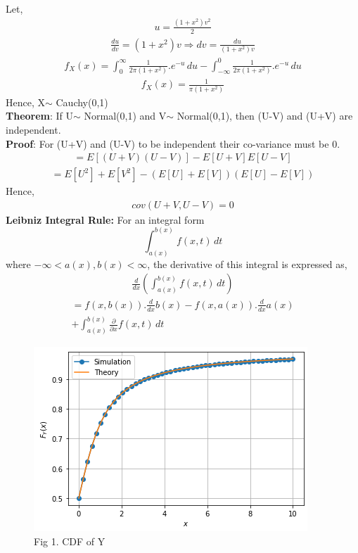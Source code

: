 \documentclass[journal,12pt,twocolumn]{IEEEtran}
\begin{document}
Let,
\begin{align}
 u = \frac{(1+x^2)v^2}{2}
\end{align}
\begin{align}
 \frac{du}{dv} = (1+x^2)v \Rightarrow dv = \frac{du}{(1+x^2)v}
\end{align}
\begin{align}
    f_{X}(x) = \int_{0}^{\infty}  \frac{1}{2\pi (1+x^2)}.e^{-u} \,du - \int_{-\infty}^{0}\frac{1}{2\pi(1+x^2)}.e^{-u}\,du
\end{align}
\begin{align}
    f_{X}(x) = \frac{1}{\pi(1+x^2)}
\end{align}
Hence, X$\sim$ Cauchy(0,1) \\
\textbf{Theorem}: If U$\sim$ Normal(0,1) and V$\sim$ Normal(0,1), then (U-V) and (U+V) are independent. \\
\textbf{Proof}: For (U+V) and (U-V) to be independent their co-variance must be 0.
\begin{align}
   = E[(U+V)(U-V)]-E[U+V]E[U-V]
\end{align}
\begin{align}
   = E[U^2]+E[V^2]-(E[U]+E[V])(E[U]-E[V])
\end{align}
Hence,
\begin{align}
   cov(U+V,U-V)=0
\end{align}
\textbf{Leibniz Integral Rule:}
For an integral form \[ \int_{a(x)}^{b(x)} f(x,t) \,dt \]
where $-\infty<a(x),b(x)<\infty$, the derivative of this integral is expressed as,
\begin{align}
   \frac{d}{dx} \left(\int_{a(x)}^{b(x)} f(x,t) \,dt\right)
\end{align}
\begin{align}
   = f(x,b(x)).\frac{d}{dx}b(x)-f(x,a(x)).\frac{d}{dx}a(x) \\
   +\int_{a(x)}^{b(x)} \frac{\partial}{\partial x} f(x,t) \,dt
\end{align}
\begin{figure}[ht]
\centering
\includegraphics[width=\columnwidth]{cdf.png}
\caption*{Fig 1. CDF of Y}
\label{fig:fig1}
\end{figure}
\end{document}
